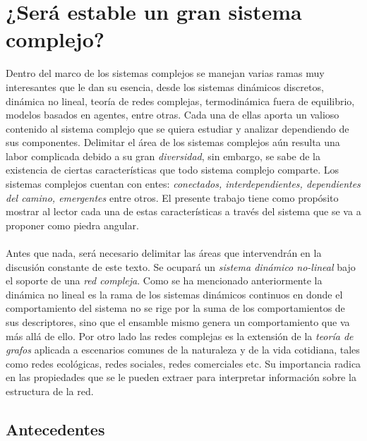 \chapter{¿Será estable un gran sistema complejo?}
\setlength{\parindent}{0cm}
Dentro del marco de los sistemas complejos se manejan varias ramas muy interesantes que le dan su esencia, desde los sistemas dinámicos discretos, dinámica no lineal, teoría de redes complejas, termodinámica fuera de equilibrio, modelos basados en agentes, entre otras. Cada una de ellas aporta un valioso contenido al sistema complejo que se quiera estudiar y analizar dependiendo de sus componentes. Delimitar el área de los sistemas complejos aún resulta una labor complicada debido a su gran \textit{diversidad}, sin embargo, se sabe de la existencia de ciertas características que todo sistema complejo comparte. Los sistemas complejos cuentan con entes: \textit{conectados, interdependientes, dependientes del camino, emergentes} entre otros. El presente trabajo tiene como propósito mostrar al lector cada una de estas características a través del sistema que se va a proponer como piedra angular.\\
\\
Antes que nada, será necesario delimitar las áreas que intervendrán en la discusión constante de este texto. Se ocupará un \textit{sistema dinámico no-lineal} bajo el soporte de una \textit{red compleja}. Como se ha mencionado anteriormente la dinámica no lineal es la rama de los sistemas dinámicos continuos en donde el comportamiento del sistema no se rige por la suma de los comportamientos de sus descriptores, sino que el ensamble mismo genera un comportamiento que va más allá de ello. Por otro lado las redes complejas es la extensión de la \textit{teoría de grafos} aplicada a escenarios comunes de la naturaleza y de la vida cotidiana, tales como redes ecológicas, redes sociales, redes comerciales etc. Su importancia radica en las propiedades que se le pueden extraer para interpretar información sobre la estructura de la red.
\newpage
\section{Antecedentes}\label{sec:Antecedentes}

